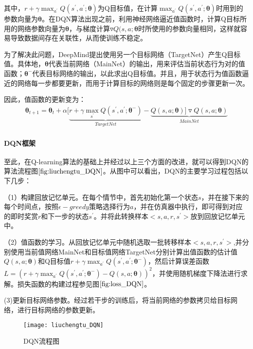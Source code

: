 其中，$r+\gamma \max_{a^{'}}Q(s^{'},a^{'};\bm{\theta})$为Q目标值，在计算$\max_{a^{'}}Q(s^{'},a^{'};\bm{\theta})$时用到的参数向量为$\bm{\theta}$。在DQN算法出现之前，利用神经网络逼近值函数时，计算Q目标所用的网络参数向量为$\bm{\theta}$，与梯度计算$\triangledown Q(s,a;\bm{\theta}$时所使用的参数向量相同，这样就容易导致数据间存在关联性，从而使训练不稳定。

为了解决此问题，DeepMind提出使用另一个目标网络（TargetNet）产生Q目标值。具体地，$\bm{\theta}$代表当前网络（MainNet）的输出，用来评估当前状态行为对的值函数；$\bm{\theta}^{-}$代表目标网络的输出，以此求出Q目标值。并且，用于状态行为值函数逼近的网络每一步都要更新，而用于计算目标的网络则是每个固定的步骤更新一次。

因此，值函数的更新变为：
\begin{equation}
\begin{aligned}
\bm{\theta}_{t+1}=\bm{\theta}_{t}+\alpha[\underbrace{r+\gamma \max_{s^{'}}Q(s^{'},a^{'};\bm{\theta}^{-})}_{TargetNet}-\underbrace{Q(s,a;\bm{\theta})]\triangledown Q(s,a;\bm{\theta})}_{MainNet}
\end{aligned}
\end{equation}

 \paragraph{DQN框架}
 至此，在Q-learning算法的基础上并经过以上三个方面的改进，就可以得到DQN的算法流程图$\ref{fig:liuchengtu_DQN}$。从图中可以看出，DQN的主要学习过程包括以下几步：

（1）构建回放记忆单元。在每个情节中，首先初始化第一个状态$s$，并在接下来的每个时间点，按照$\epsilon-greedy$策略选择行为$a$，并在仿真器中执行，即可得到对应的即时奖赏$r$和下一步的状态$s^{'}$。并将此转换样本$<s,a,r,s^{'}>$放到回放记忆单元中。

（2）值函数的学习。从回放记忆单元中随机选取一批转移样本$<s,a,r,s^{'}>$,并分别使用当前值网络MainNet和目标值网络TargetNet分别计算出值函数的估计值 $Q(s,a;\bm{\theta})$和Q目标值$r+\gamma \max_{a^{'}}Q(s^{'},a^{'};\bm{\theta}^{-})$，然后计算误差函数$L=(r+\gamma \max_{a^{'}}Q(s^{'},a^{'};\bm{\theta}^{-})-Q(s,a;\bm{\theta}))^{2}$，并使用随机梯度下降法进行求解。损失函数的构建过程参见图$\ref{fig:loss_DQN}$。

(3)更新目标网络参数。经过若干步的训练后，将当前网络的参数拷贝给目标网络，进行目标网络的参数更新。

\begin{figure}[htbp]
\centering
\texttt{[image: liuchengtu\_DQN]}
\caption{DQN流程图}
\label{fig:liuchengtu_DQN}
\end{figure}

